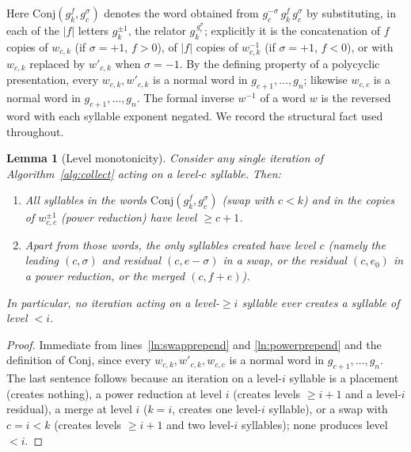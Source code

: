 \documentclass{amsart}
\newtheorem{lemma}{Lemma}
\theoremstyle{definition}
\begin{document}
Here $\mathrm{Conj}(g_k^{f},g_c^{\sigma})$ denotes the word obtained from $g_c^{-\sigma}\,g_k^{f}\,g_c^{\sigma}$
by substituting, in each of the $|f|$ letters $g_k^{\pm1}$, the relator
$g_k^{\,g_c^{\sigma}}$; explicitly it is the concatenation of $f$ copies of $w_{c,k}$ (if
$\sigma=+1$, $f>0$), of $|f|$ copies of $w_{c,k}^{-1}$ (if $\sigma=+1$, $f<0$), or with
$w_{c,k}$ replaced by $w'_{c,k}$ when $\sigma=-1$. By the defining property of a polycyclic
presentation, every $w_{c,k},w'_{c,k}$ is a normal word in $g_{c+1},\dots,g_n$; likewise
$w_{c,c}$ is a normal word in $g_{c+1},\dots,g_n$. The formal inverse $w^{-1}$ of a word $w$
is the reversed word with each syllable exponent negated. We record the structural fact used
throughout.

\begin{lemma}[Level monotonicity]\label{lem:level}
Consider any single iteration of Algorithm~\ref{alg:collect} acting on a level-$c$ syllable.
Then:
\begin{enumerate}
\item All syllables in the words $\mathrm{Conj}(g_k^{f},g_c^{\sigma})$ \textup{(}swap with
$c<k$\textup{)} and in the copies of $w_{c,c}^{\pm1}$ \textup{(}power reduction\textup{)} have
level $\ge c+1$.
\item Apart from those words, the only syllables created have level $c$ \textup{(}namely the
leading $(c,\sigma)$ and residual $(c,e-\sigma)$ in a swap, or the residual $(c,e_0)$ in a
power reduction, or the merged $(c,f+e)$\textup{)}.
\end{enumerate}
In particular, no iteration acting on a level-$\ge i$ syllable ever creates a syllable of
level $<i$.
\end{lemma}

\begin{proof}
Immediate from lines~\ref{ln:swapprepend} and \ref{ln:powerprepend} and the definition of
$\mathrm{Conj}$, since every $w_{c,k},w'_{c,k},w_{c,c}$ is a normal word in
$g_{c+1},\dots,g_n$. The last sentence follows because an iteration on a level-$i$ syllable is
a placement (creates nothing), a power reduction at level $i$ (creates levels $\ge i+1$ and a
level-$i$ residual), a merge at level $i$ ($k=i$, creates one level-$i$ syllable), or a swap
with $c=i<k$ (creates levels $\ge i+1$ and two level-$i$ syllables); none produces level $<i$.
\end{proof}
\end{document}
